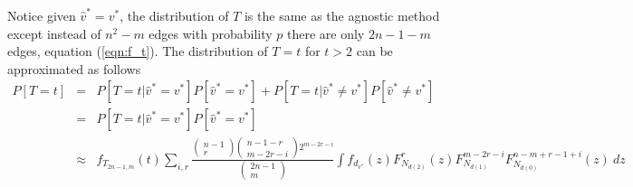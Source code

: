 \documentclass{article}
\begin{document}
Notice given $\hat{v}^* = v^*$, the distribution of $T$ is the same as the agnostic method except instead of $n^2-m$ edges with probability $p$ there are only $2n-1-m$ edges, equation (\ref{eqn:f_t}). The distribution of $T=t$ for $t>2$ can be approximated as follows
\begin{eqnarray*}
P[T=t] 
&=& P[T=t|\hat{v}^* = v^*] P[\hat{v}^* = v^*]+ P[T=t|\hat{v}^* \neq v^*] P[\hat{v}^* \neq v^*]
\\
&=& P[T=t|\hat{v}^* = v^*] P[\hat{v}^* = v^*]
\\
&\approx& f_{T_{2n-1, m}}(t)
	\sum_{i,r} \frac{\left(\begin{matrix}n-1\\r \end{matrix}\right) \left(\begin{matrix}n-1-r\\m-2r-i \end{matrix}\right)2^{m-2r-i}}
{\left(\begin{matrix}2n-1\\m \end{matrix}\right)}
		\int f_{d_{v^*}}(z) F_{N_{d(2)}}^r(z) F_{N_{d(1)}}^{m-2r-i} F_{N_{d(0)}}^{n-m+r-1+i}(z) \ dz
\end{eqnarray*}
\end{document}
